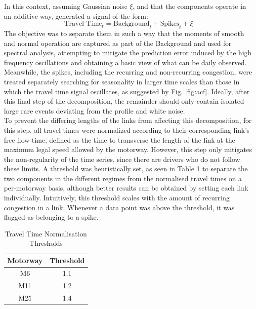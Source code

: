 \documentclass[letterpaper, 10 pt, conference]{ieeeconf}  %
\begin{document}
In this context, assuming Gaussian noise $\xi$, and that the components operate in an additive way, generated a signal of the form:
\begin{equation}
\textrm{Travel Time}_t  = \textrm{Background}_t + \textrm{Spikes}_t + \xi
\end{equation}
The objective was to separate them in such a way that the moments of smooth and normal operation are captured as part of the Background and used for spectral analysis, attempting to mitigate the prediction error induced by the high frequency oscillations and obtaining a basic view of what can be daily observed.
Meanwhile, the spikes, including the recurring and non-recurring congestion, were treated separately searching for seasonality in larger time scales than those in which the travel time signal oscillates, as suggested by Fig. \ref{fig:acf}. 
Ideally, after this final step of the decomposition, the remainder should only contain isolated large rare events deviating from the profile and white noise.\\

To prevent the differing lengths of the links from affecting this decomposition, for this step, all travel times were normalized according to their corresponding link's free flow time, defined as the time to transverse the length of the link at the maximum legal speed allowed by the motorway. 
However, this step only mitigates the non-regularity of the time series, since there are drivers who do not follow these limits.
A threshold was heuristically set, as seen in Table \ref{table:threshold}  to separate the two components in the different regimes from the normalised travel times on a per-motorway basis, although better results can be obtained by setting each link individually. 
Intuitively, this threshold scales with the amount of recurring congestion in a link. Whenever a data point was above the threshold, it was flagged as belonging to a spike.
\begin{table}[htbp]
	\caption{Travel Time Normalisation Thresholds}
	\begin{center}
		\begin{tabular}{|c|c|}
			\hline
			\textbf{Motorway}&{\textbf{Threshold}} \\
			\hline
			M6& 1.1\\
			\hline
			M11& 1.2\\
			\hline
			M25& 1.4\\
			\hline
		\end{tabular}
		\label{table:threshold}
	\end{center}
\end{table}
\end{document}
